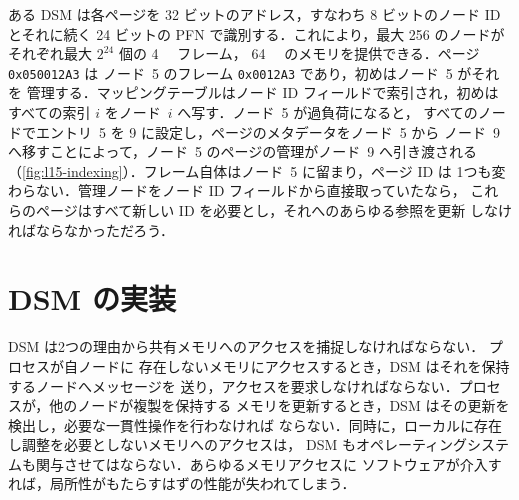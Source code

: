 \documentclass[../main.tex]{subfiles}
\begin{document}
\begin{example}
  ある DSM は各ページを 32 ビットのアドレス，すなわち 8 ビットのノード ID
  とそれに続く 24 ビットの PFN で識別する．これにより，最大 256 のノードが
  それぞれ最大 $2^{24}$ 個の \SI{4}{\kibi\byte} フレーム，
  \SI{64}{\gibi\byte} のメモリを提供できる．ページ \texttt{0x050012A3} は
  ノード~5 のフレーム \texttt{0x0012A3} であり，初めはノード~5 がそれを
  管理する．マッピングテーブルはノード ID フィールドで索引され，初めは
  すべての索引 $i$ をノード~$i$ へ写す．ノード~5 が過負荷になると，
  すべてのノードでエントリ~5 を 9 に設定し，ページのメタデータをノード~5 から
  ノード~9 へ移すことによって，ノード~5 のページの管理がノード~9 へ引き渡される
  （\cref{fig:l15-indexing}）．フレーム自体はノード~5 に留まり，ページ ID は
  1つも変わらない．管理ノードをノード ID フィールドから直接取っていたなら，
  これらのページはすべて新しい ID を必要とし，それへのあらゆる参照を更新
  しなければならなかっただろう．
\end{example}

\section{DSM の実装}
\label{sec:l15-implementing}

DSM は2つの理由から共有メモリへのアクセスを捕捉しなければならない．
プロセスが自ノードに
存在しないメモリにアクセスするとき，DSM はそれを保持するノードへメッセージを
送り，アクセスを要求しなければならない．プロセスが，他のノードが複製を保持する
メモリを更新するとき，DSM はその更新を検出し，必要な一貫性操作を行わなければ
ならない．同時に，ローカルに存在し調整を必要としないメモリへのアクセスは，
DSM もオペレーティングシステムも関与させてはならない．あらゆるメモリアクセスに
ソフトウェアが介入すれば，局所性がもたらすはずの性能が失われてしまう．
\end{document}
